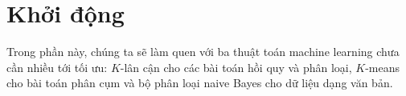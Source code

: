 \part{Khởi động}
\label{part:warmup}
Trong phần này, chúng ta sẽ làm quen với ba thuật toán machine learning chưa cần
nhiều tới tối ưu: $K$-lân cận cho các bài toán hồi quy và phân loại, $K$-means cho bài toán phân cụm và bộ phân loại naive Bayes cho dữ liệu dạng văn bản.
